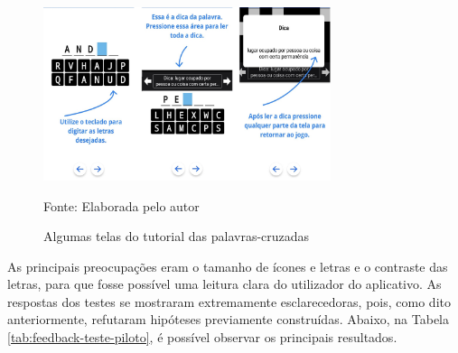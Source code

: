 \begin{figure}[H]
\centering
    \caption{Algumas telas do tutorial das palavras-cruzadas}
    \label{fig:tutorial}
    \includegraphics[width=0.75\textwidth]{Figuras/tutorial.jpg}
    
    Fonte: Elaborada pelo autor
\end{figure}

As principais preocupações eram o tamanho de ícones e letras e o contraste das letras, para que fosse possível uma leitura clara do utilizador do aplicativo. 
As respostas dos testes se mostraram extremamente esclarecedoras, pois, como dito anteriormente, refutaram hipóteses previamente construídas. Abaixo, na Tabela \ref{tab:feedback-teste-piloto}, é possível observar os principais resultados.

